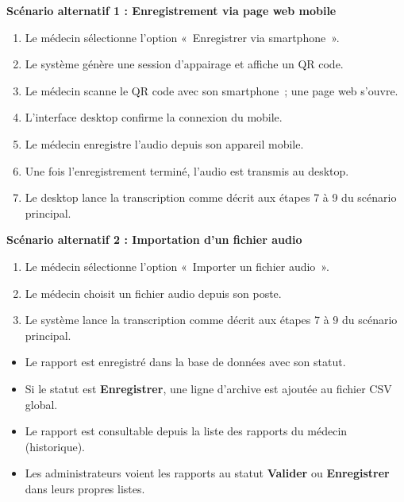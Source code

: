 \documentclass[11pt]{article}
\begin{document}
\begin{description}[leftmargin=4.2cm, style=nextline]
    \item[Scénarios alternatifs]
    \textbf{Scénario alternatif 1 : Enregistrement via page web mobile}
    \begin{enumerate}[leftmargin=*, topsep=0pt, itemsep=0pt]
        \item Le médecin sélectionne l'option «~Enregistrer via smartphone~».
        \item Le système génère une session d'appairage et affiche un QR code.
        \item Le médecin scanne le QR code avec son smartphone~; une page web s'ouvre.
        \item L'interface desktop confirme la connexion du mobile.
        \item Le médecin enregistre l'audio depuis son appareil mobile.
        \item Une fois l'enregistrement terminé, l'audio est transmis au desktop.
        \item Le desktop lance la transcription comme décrit aux étapes 7 à 9 du scénario principal.
    \end{enumerate}

    \textbf{Scénario alternatif 2 : Importation d'un fichier audio}
    \begin{enumerate}[leftmargin=*, topsep=0pt, itemsep=0pt]
        \item Le médecin sélectionne l'option «~Importer un fichier audio~».
        \item Le médecin choisit un fichier audio depuis son poste.
        \item Le système lance la transcription comme décrit aux étapes 7 à 9 du scénario principal.
    \end{enumerate}

    \item[Postconditions]
    \begin{itemize}[leftmargin=*, nosep]
        \item Le rapport est enregistré dans la base de données avec son statut.
        \item Si le statut est \textbf{Enregistrer}, une ligne d'archive est ajoutée au fichier CSV global.
        \item Le rapport est consultable depuis la liste des rapports du médecin (historique).
        \item Les administrateurs voient les rapports au statut \textbf{Valider} ou \textbf{Enregistrer}
              dans leurs propres listes.
    \end{itemize}


\end{description}
\end{document}
